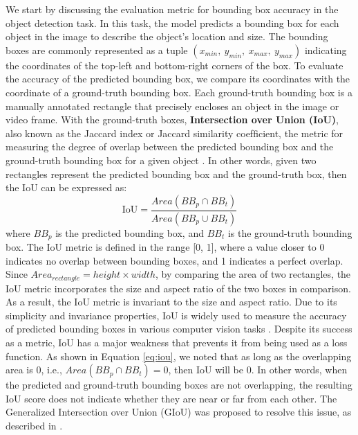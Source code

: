 We start by discussing the evaluation metric for bounding box accuracy in the object detection task. In this task, the model predicts a bounding box for each object in the image to describe the object's location and size. The bounding boxes are commonly represented as a tuple $(x_{min},\ y_{min},\ x_{max},\ y_{max})$ indicating the coordinates of the top-left and bottom-right corners of the box. To evaluate the accuracy of the predicted bounding box, we compare its coordinates with the coordinate of a ground-truth bounding box. Each ground-truth bounding box is a manually annotated rectangle that precisely encloses an object in the image or video frame. With the ground-truth boxes, \textbf{Intersection over Union (IoU)}, also known as the Jaccard index or Jaccard similarity coefﬁcient, the metric for measuring the degree of overlap between the predicted bounding box and the ground-truth bounding box for a given object \cite{generalized_iou}. In other words, given two rectangles represent the predicted bounding box and the ground-truth box, then the IoU can be expressed as:
\begin{equation}
    \text{IoU} = \frac{Area(BB_p \cap BB_t)}{Area(BB_p \cup BB_t)} \label{eq:iou}
\end{equation}
where $BB_p$ is the predicted bounding box, and $BB_t$ is the ground-truth bounding box. The IoU metric is defined in the range [0, 1], where a value closer to 0 indicates no overlap between bounding boxes, and 1 indicates a perfect overlap. Since $Area_{rectangle} = height \times width$, by comparing the area of two rectangles, the IoU metric incorporates the size and aspect ratio of the two boxes in comparison. As a result, the IoU metric is invariant to the size and aspect ratio. Due to its simplicity and invariance properties, IoU is widely used to measure the accuracy of predicted bounding boxes in various computer vision tasks \cite{generalized_iou}. Despite its success as a metric, IoU has a major weakness that prevents it from being used as a loss function. As shown in Equation \ref{eq:iou}, we noted that as long as the overlapping area is 0, i.e., $Area(BB_p \cap BB_t) = 0$, then IoU will be 0. In other words, when the predicted and ground-truth bounding boxes are not overlapping, the resulting IoU score does not indicate whether they are near or far from each other. The Generalized Intersection over Union (GIoU) was proposed to resolve this issue, as described in \cite{generalized_iou}.

